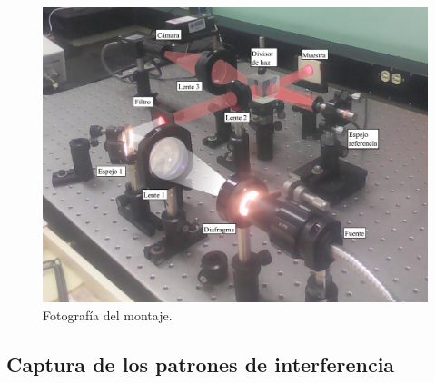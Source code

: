 \begin{figure}[h!]
	\centering
	\includegraphics[width=0.8\linewidth]{img/chap2/Montaje}
	\caption[Fotografía del montaje.]{Fotografía del montaje.}
	\label{fig:montaje}
\end{figure}

\subsection{Captura de los patrones de interferencia}

